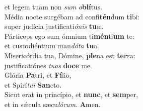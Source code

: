 \oddverse et legem tuam non \textit{sum} \textit{o}\textbf{blí}tus.\\
\evenverse Média nocte surgébam ad confi\textbf{tén}dum \textbf{ti}bi:~\*\\
\evenverse super judícia justificati\textit{ó}\textit{nis} \textbf{tu}æ.\\
\oddverse Párticeps ego sum ómnium ti\textbf{mén}ti\textbf{um} te:~\*\\
\oddverse et custodiéntium man\textit{dá}\textit{ta} \textbf{tu}a.\\
\evenverse Misericórdia tua, Dómine, \textbf{ple}na est \textbf{ter}ra:~\*\\
\evenverse justificatiónes \textit{tu}\textit{as} \textbf{do}\textbf{ce} me.\\
\oddverse Glória \textbf{Pa}tri, et \textbf{Fí}lio,~\*\\
\oddverse et Spirí\textit{tu}\textit{i} \textbf{San}cto.\\
\evenverse Sicut erat in princípio, et \textbf{nunc}, et \textbf{sem}per,~\*\\
\evenverse et in sǽcula sæcu\textit{ló}\textit{rum}. \textbf{A}men.\\
